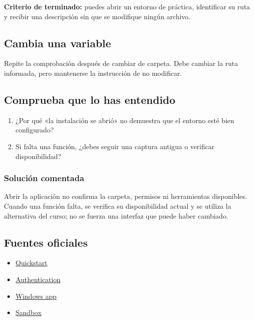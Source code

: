 \documentclass[10pt,a4paper,openany]{book}
\providecommand{\tightlist}{\setlength{\itemsep}{0.18em}\setlength{\parskip}{0pt}}
\begin{document}
\begin{successbox}

\textbf{Criterio de terminado:} puedes abrir un entorno de práctica,
identificar su ruta y recibir una descripción sin que se modifique
ningún archivo.

\end{successbox}

\subsection{Cambia una variable}\label{cambia-una-variable-2}

Repite la comprobación después de cambiar de carpeta. Debe cambiar la
ruta informada, pero mantenerse la instrucción de no modificar.

\subsection{Comprueba que lo has
entendido}\label{comprueba-que-lo-has-entendido-2}

\begin{enumerate}
\def\labelenumi{\arabic{enumi}.}
\tightlist
\item
  ¿Por qué «la instalación se abrió» no demuestra que el entorno esté
  bien configurado?
\item
  Si falta una función, ¿debes seguir una captura antigua o verificar
  disponibilidad?
\end{enumerate}

\subsubsection{Solución comentada}\label{soluciuxf3n-comentada-2}

Abrir la aplicación no confirma la carpeta, permisos ni herramientas
disponibles. Cuando una función falta, se verifica su disponibilidad
actual y se utiliza la alternativa del curso; no se fuerza una interfaz
que puede haber cambiado.

\subsection{Fuentes oficiales}\label{fuentes-oficiales-2}

\begin{itemize}
\tightlist
\item
  \href{https://learn.chatgpt.com/docs/quickstart}{Quickstart}
\item
  \href{https://learn.chatgpt.com/docs/auth}{Authentication}
\item
  \href{https://learn.chatgpt.com/docs/windows/windows-app}{Windows app}
\item
  \href{https://learn.chatgpt.com/docs/sandboxing}{Sandbox}
\end{itemize}
\end{document}
